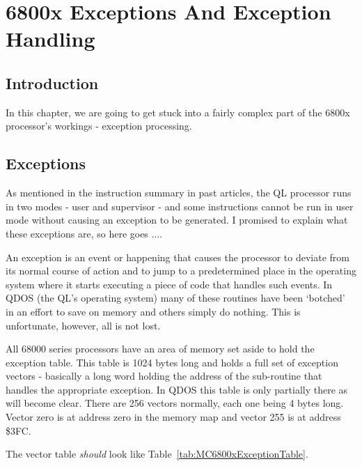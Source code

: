 \chapter{6800x Exceptions And Exception Handling}

\section{Introduction}
\label{ch6-introduction}%

In this chapter, we are going to get stuck into a fairly complex
    part of the 6800x processor's workings -{} exception processing.

\section{Exceptions}
\label{ch6-exceptions}%

As mentioned in the instruction summary in past articles, the QL
    processor runs in two modes -{} user and supervisor -{} and some instructions
    cannot be run in user mode without causing an exception to be generated. I
    promised to explain what these exceptions are, so here goes ....

An exception is an event or happening that causes the processor to
    deviate from its normal course of action and to jump to a predetermined
    place in the operating system where it starts executing a piece of code
    that handles such events. In QDOS (the QL's operating system) many of
    these routines have been `botched' in an effort to save on memory and
    others simply do nothing. This is unfortunate, however, all is not
    lost.

All 68000 series processors have an area of memory set aside to hold
    the exception table. This table is 1024 bytes long and holds a full set of
    exception vectors -{} basically a long word holding the address of the
    sub-{}routine that handles the appropriate exception. In QDOS this table is
    only partially there as will become clear. There are 256 vectors normally,
    each one being 4 bytes long. Vector zero is at address zero in the memory
    map and vector 255 is at address \$3FC.

The vector table \emph{should} look like Table~\ref{tab:MC6800xExceptionTable}.

